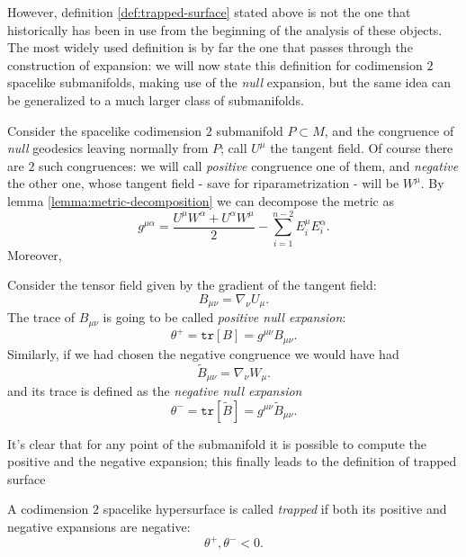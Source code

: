 However, definition \ref{def:trapped-surface} stated above is not the one that historically has been in use from the beginning of the analysis of these objects. The most widely used definition is by far the one that passes through the construction of expansion: we will now state this definition for codimension \(2\) spacelike submanifolds, making use of the \emph{null} expansion, but the same idea can be generalized to a much larger class of submanifolds. 

Consider the spacelike codimension \(2\) submanifold \(P\subset M\), and the congruence of \emph{null} geodesics leaving normally from \(P\); call \(U^{\mu}\) the tangent field. 
Of course there are \(2\) such congruences: we will call \emph{positive} congruence one of them, and \emph{negative} the other one, whose tangent field - save for riparametrization - will be \(W^{\mu}\). By lemma \ref{lemma:metric-decomposition} we can decompose the metric as 
\[
g^{\mu\alpha} = \frac{U^{\mu}W^{\alpha} + U^{\alpha}W^{\mu}}{2} - \sum_{i=1}^{n - 2}E_i^{\mu}E_i^{\alpha}.
\]
Moreover,
\begin{definition}
	 Consider the tensor field given by the gradient of the tangent field:
	\[
	B_{\mu\nu} = \nabla_{\nu}U_{\mu}.
	\]
	The trace of \(B_{\mu\nu}\) is going to be called \emph{positive null expansion}:
	\[
	\theta^{+} = \texttt{tr}\left[B\right] = g^{\mu\nu}B_{\mu\nu}.
	\]
	Similarly, if we had chosen the negative congruence we would have had
	\[
	\tilde{B}_{\mu\nu} = \nabla_{\nu}W_{\mu}.
	\]
	and its trace is defined as the \emph{negative null expansion}
	\[
	\theta^{-} = \texttt{tr}\left[\tilde{B}\right] = g^{\mu\nu}\tilde{B}_{\mu\nu}.
	\]
\end{definition}

It's clear that for any point of the submanifold it is possible to compute the positive and the negative expansion; this finally leads to the definition of trapped surface
\begin{definition}
	A codimension \(2\) spacelike hypersurface is called \emph{trapped} if both its positive and negative expansions are negative:
	\[
	\theta^+ , \theta^- < 0.
	\]
\end{definition}

